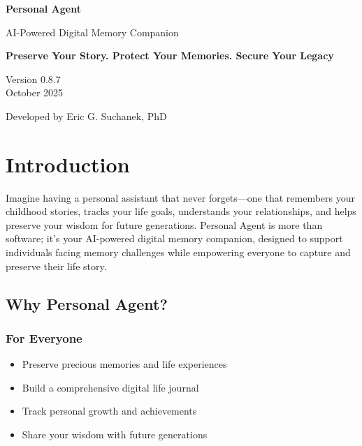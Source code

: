 \documentclass[11pt,letterpaper]{article}
\begin{document}
\begin{titlepage}
\centering
\vspace*{2cm}

{\Huge\bfseries\color{primaryblue} Personal Agent\par}
\vspace{0.5cm}
{\Large\color{secondarygreen} AI-Powered Digital Memory Companion\par}
\vspace{2cm}

{\LARGE\textbf{Preserve Your Story. Protect Your Memories. Secure Your Legacy}\par}

\vfill

{\large Version 0.8.7 \\ October 2025\par}
\vspace{1cm}

{\large Developed by Eric G. Suchanek, PhD\par}

\end{titlepage}

\tableofcontents
\newpage

\section{Introduction}

Imagine having a personal assistant that never forgets---one that remembers your childhood stories, tracks your life goals, understands your relationships, and helps preserve your wisdom for future generations. Personal Agent is more than software; it's your AI-powered digital memory companion, designed to support individuals facing memory challenges while empowering everyone to capture and preserve their life story.

\subsection{Why Personal Agent?}

\subsubsection{For Everyone}
\begin{itemize}[leftmargin=*]
    \item Preserve precious memories and life experiences
    \item Build a comprehensive digital life journal
    \item Track personal growth and achievements
    \item Share your wisdom with future generations
\end{itemize}
\end{document}
